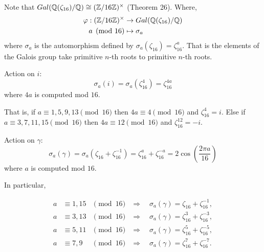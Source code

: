 \documentclass[12pt]{article}
\begin{document}
\begin{solution}
\begin{enumerate}
        Note that $Gal(\mathbb Q(\zeta_{16})/\mathbb Q) \cong (\mathbb Z/16\mathbb Z)^\times$ (Theorem 26). Where, 
        \begin{align*}
        \varphi: (\mathbb Z/16\mathbb Z)^\times &\to Gal(\mathbb Q(\zeta_{16})/\mathbb Q) \\ 
        a \pmod {16} &\mapsto  \sigma_a
        \end{align*}
        where $\sigma_a$ is the automorphism defined by $\sigma_a(\zeta_{16}) = \zeta_{16}^a$. That is the elements of the Galois group take primitive $n$-th roots to primitive $n$-th roots. 
        
        Action on $i$: 
        \[\sigma_a (i) = \sigma_a(\zeta_{16}^4) = \zeta_{16}^{4a}\]
        where $4a$ is computed mod $16$. 
        
        That is, if $a \equiv 1, 5, 9, 13 \pmod {16}$ then $4a \equiv 4 \pmod {16}$ and $\zeta_{16}^4 = i$. Else if $a \equiv 3, 7, 11, 15 \pmod {16}$ then $4a \equiv 12 \pmod {16}$ and $\zeta_{16}^{12} = -i$. 

        Action on $\gamma$: 
        \[\sigma_a (\gamma) = \sigma_a(\zeta_{16} + \zeta_{16}^{-1}) = \zeta_{16}^{a} + \zeta_{16}^{-a} = 2\cos\!\left(\frac{2\pi a}{16}\right)\]
        where $a$ is computed mod $16$. 

        In particular,

        \[
        \begin{aligned}
        a &\equiv 1,15 &\pmod{16}
        &\Rightarrow\quad
        \sigma_a(\gamma)=\zeta_{16}+\zeta_{16}^{-1}, \\[6pt]
        a &\equiv 3,13 &\pmod{16}
        &\Rightarrow\quad
        \sigma_a(\gamma)=\zeta_{16}^3+\zeta_{16}^{-3}, \\[6pt]
        a &\equiv 5,11 &\pmod{16}
        &\Rightarrow\quad
        \sigma_a(\gamma)=\zeta_{16}^5+\zeta_{16}^{-5}, \\[6pt]
        a &\equiv 7,9 &\pmod{16}
        &\Rightarrow\quad
        \sigma_a(\gamma)=\zeta_{16}^7+\zeta_{16}^{-7}.
        \end{aligned}    
        \]
    \end{enumerate}
\end{solution}

\newpage 
\end{document}
